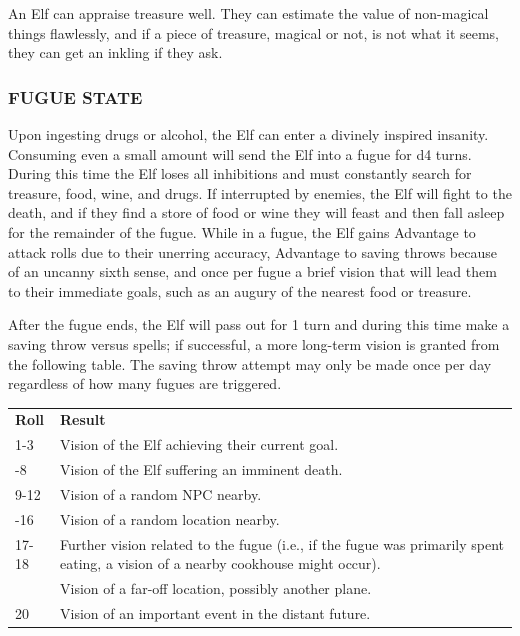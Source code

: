 \documentclass[twoside]{article}
\begin{document}
An Elf can appraise treasure well. They can estimate the value of non-magical things flawlessly, and if a piece of treasure, magical or not, is not what it seems, they can get an inkling if they ask.

\subsubsection*{\footnotesize{F}\scriptsize{UGUE} \footnotesize{S}\scriptsize{TATE}\normalsize}

Upon ingesting drugs or alcohol, the Elf can enter a divinely inspired insanity. Consuming even a small amount will send the Elf into a fugue for d4 turns. During this time the Elf loses all inhibitions and must constantly search for treasure, food, wine, and drugs. If interrupted by enemies, the Elf will fight to the death, and if they find a store of food or wine they will feast and then fall asleep for the remainder of the fugue. While in a fugue, the Elf gains Advantage to attack rolls due to their unerring accuracy, Advantage to saving throws because of an uncanny sixth sense, and once per fugue a brief vision that will lead them to their immediate goals, such as an augury of the nearest food or treasure.

\bigbreak

After the fugue ends, the Elf will pass out for 1 turn and during this time make a saving throw versus spells; if successful, a more long-term vision is granted from the following table. The saving throw attempt may only be made once per day regardless of how many fugues are triggered.

\bigbreak

\begin{center}
\noindent\begin{tabular}{>{\centering\arraybackslash}p{}p{}}
\textbf{Roll}&\textbf{Result}\\
\rowcolor[gray]{0.75}1-3&Vision of the Elf achieving their current goal.\\
4-8&Vision of the Elf suffering an imminent death.\\
\rowcolor[gray]{0.75}9-12&Vision of a random NPC nearby.\\
13-16&Vision of a random location nearby.\\
\rowcolor[gray]{0.75}17-18&Further vision related to the fugue (i.e., if the fugue was primarily spent eating, a vision of a nearby cookhouse might occur).\\
19&Vision of a far-off location, possibly another plane.\\
\rowcolor[gray]{0.75}20&Vision of an important event in the distant future.\\
\end{tabular}
\end{center}
\end{document}
